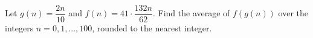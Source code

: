 Let $g(n)=\dfrac{2n}{10}$ and $f(n)=41\cdot\dfrac{132n}{62}$. Find the average of $f(g(n))$ over the integers $n=0,1,\dots,100$, rounded to the nearest integer.
